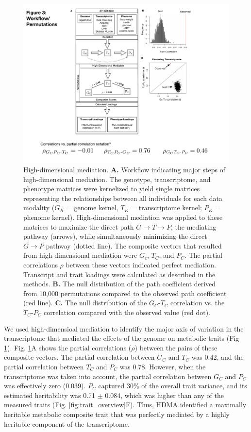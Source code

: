 \documentclass[
]{article}
\begin{document}
\begin{figure}[ht!]
\includegraphics[width=5in]{Figures/Fig3_workflow.pdf} 
\caption{High-dimensional mediation. \textbf{A.} Workflow indicating 
major steps of high-dimensional mediation. The genotype, transcriptome, 
and phenotype matrices were kernelized to yield single matrices representing 
the relationships between all individuals for each data modality ($G_K$ = 
genome kernel, $T_K$ = transcriptome kernel; $P_K$ = phenome kernel). High-dimensional 
mediation was applied to these matrices to maximize the direct path 
$G \rightarrow T \rightarrow P$, the mediating pathway (arrows), while 
simultaneously minimizing the direct $G \rightarrow P$ pathway (dotted line). 
The composite vectors that resulted from high-dimensional mediation were 
$G_c$, $T_C$, and $P_C$. The partial correlations $\rho$ between these vectors 
indicated perfect mediation. Transcript and trait loadings were calculated 
as described in the methods. \textbf{B.} The null distribution of the path 
coefficient derived from 10,000 permutations compared to the observed path 
coefficient (red line). \textbf{C.} The null distribution of the $G_C$-$T_C$ 
correlation vs. the $T_C$-$P_C$ correlation compared with the observed value 
(red dot).
}
\label{fig:workflow}
\end{figure}

We used high-dimensioal mediation to identify the major axis of
variation in the transcriptome that mediated the effects of the genome
on metabolic traits (Fig \ref{fig:workflow}). Fig. \ref{fig:workflow}A
shows the partial correlations (\(\rho\)) between the pairs of these
composite vectors. The partial correlation between \(G_C\) and \(T_C\)
was 0.42, and the partial correlation between \(T_C\) and \(P_C\) was
0.78. However, when the transcriptome was taken into account, the
partial correlation between \(G_C\) and \(P_C\) was effectively zero
(0.039). \(P_C\) captured 30\% of the overall trait variance, and its
estimated heritability was 0.71 \(\pm\) 0.084, which was higher than any
of the measured traits (Fig. \ref{fig:trait_overview}F). Thus, HDMA
identified a maximally heritable metabolic composite trait that was
perfectly mediated by a highly heritable component of the transcriptome.
\end{document}
